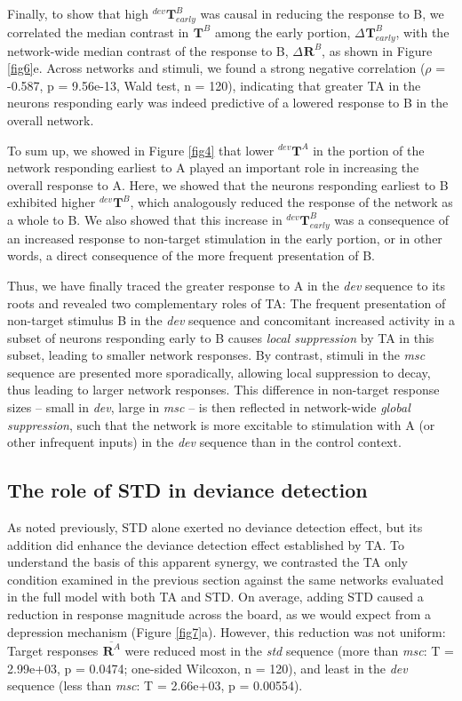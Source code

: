 \documentclass[pdflatex,referee,iicol,sn-basic]{sn-jnl}
\newcommand{\dev}{\textit{dev}}
\newcommand{\msc}{\textit{msc}}
\newcommand{\std}{\textit{std}}
\renewcommand{\R}[3][]{{}^{#1}_{}\mathbf{R}^{#2}_{#3}}
\renewcommand{\T}[3][]{{}^{#1}_{}\mathbf{T}^{#2}_{#3}}
\newcommand{\mean}[1]{\overline{#1}}
\newcommand{\reffig}[1]{Figure \ref{fig#1}}
\newcommand{\refpanel}[2]{Figure \ref{fig#1}\lowercase{#2}}
\begin{document}
Finally, to show that high $\T[dev]{B}{early}$ was causal in reducing the response to B, we correlated the median contrast in $\T{B}{}$ among the early portion, $\Delta \T{B}{early}$, with the network-wide median contrast of the response to B, $\Delta \R{B}{}$, as shown in \refpanel{6}{e}. Across networks and stimuli, we found a strong negative correlation ($\rho$ = -0.587, p = 9.56e-13, Wald test, n = 120), indicating that greater TA in the neurons responding early was indeed predictive of a lowered response to B in the overall network.

To sum up, we showed in \reffig{4} that lower $\T[dev]{A}{}$ in the portion of the network responding earliest to A played an important role in increasing the overall response to A. Here, we showed that the neurons responding earliest to B exhibited higher $\T[dev]{B}{}$, which analogously reduced the response of the network as a whole to B. We also showed that this increase in $\T[dev]{B}{early}$ was a consequence of an increased response to non-target stimulation in the early portion, or in other words, a direct consequence of the more frequent presentation of B.

Thus, we have finally traced the greater response to A in the \dev{} sequence to its roots and revealed two complementary roles of TA: The frequent presentation of non-target stimulus B in the \dev{} sequence and concomitant increased activity in a subset of neurons responding early to B causes \emph{local suppression} by TA in this subset, leading to smaller network responses. By contrast, stimuli in the \msc{} sequence are presented more sporadically, allowing local suppression to decay, thus leading to larger network responses. This difference in non-target response sizes -- small in \dev{}, large in \msc{} -- is then reflected in network-wide \emph{global suppression}, such that the network is more excitable to stimulation with A (or other infrequent inputs) in the \dev{} sequence than in the control context.

\subsection{The role of STD in deviance detection}\label{sec-std}

As noted previously, STD alone exerted no deviance detection effect, but its addition did enhance the deviance detection effect established by TA. To understand the basis of this apparent synergy, we contrasted the TA only condition examined in the previous section against the same networks evaluated in the full model with both TA and STD. On average, adding STD caused a reduction in response magnitude across the board, as we would expect from a depression mechanism (\refpanel{7}{a}). However, this reduction was not uniform: Target responses $\mean{\R{A}{}}$ were reduced most in the \std{} sequence (more than \msc{}: T = 2.99e+03, p = 0.0474; one-sided Wilcoxon, n = 120), and least in the \dev{} sequence (less than \msc{}: T = 2.66e+03, p = 0.00554).
\end{document}
